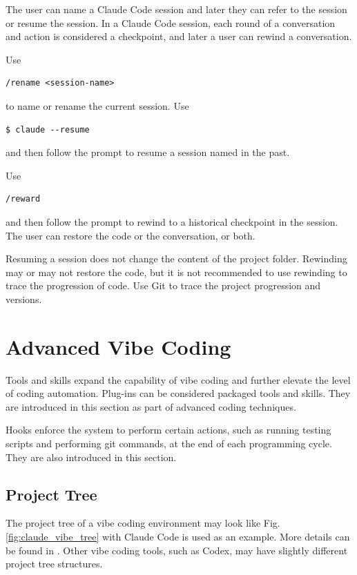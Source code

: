 The user can name a Claude Code session and later they can refer to the session or resume the session. In a Claude Code session, each round of a conversation and action is considered a checkpoint, and later a user can rewind a conversation.

Use 
\begin{lstlisting}
/rename <session-name>
\end{lstlisting}
to name or rename the current session. Use 
\begin{lstlisting}
$ claude --resume
\end{lstlisting}
and then follow the prompt to resume a session named in the past. 

Use
\begin{lstlisting}
/reward
\end{lstlisting}
and then follow the prompt to rewind to a historical checkpoint in the session. The user can restore the code or the conversation, or both.

Resuming a session does not change the content of the project folder. Rewinding may or may not restore the code, but it is not recommended to use rewinding to trace the progression of code. Use Git to trace the project progression and versions.

\section{Advanced Vibe Coding} \label{sec:advanced_coding}

Tools and skills expand the capability of vibe coding and further elevate the level of coding automation. Plug-ins can be considered packaged tools and skills. They are introduced in this section as part of advanced coding techniques.

Hooks enforce the system to perform certain actions, such as running testing scripts and performing git commands, at the end of each programming cycle. They are also introduced in this section.

\subsection{Project Tree}

The project tree of a vibe coding environment may look like Fig. \ref{fig:claude_vibe_tree} with Claude Code is used as an example. More details can be found in \cite{claudeCode2026overview}. Other vibe coding tools, such as Codex, may have slightly different project tree structures.

